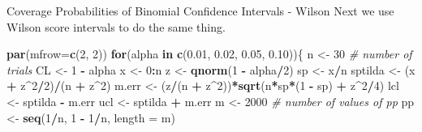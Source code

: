 \documentclass[
  ignorenonframetext,
]{beamer}
\newenvironment{Shaded}{\begin{snugshade}}{\end{snugshade}}
\newcommand{\AttributeTok}[1]{\textcolor[rgb]{0.13,0.29,0.53}{#1}}
\newcommand{\CommentTok}[1]{\textcolor[rgb]{0.56,0.35,0.01}{\textit{#1}}}
\newcommand{\ControlFlowTok}[1]{\textcolor[rgb]{0.13,0.29,0.53}{\textbf{#1}}}
\newcommand{\DecValTok}[1]{\textcolor[rgb]{0.00,0.00,0.81}{#1}}
\newcommand{\FloatTok}[1]{\textcolor[rgb]{0.00,0.00,0.81}{#1}}
\newcommand{\FunctionTok}[1]{\textcolor[rgb]{0.13,0.29,0.53}{\textbf{#1}}}
\newcommand{\NormalTok}[1]{#1}
\newcommand{\OtherTok}[1]{\textcolor[rgb]{0.56,0.35,0.01}{#1}}
\newcommand{\SpecialCharTok}[1]{\textcolor[rgb]{0.81,0.36,0.00}{\textbf{#1}}}
\begin{document}
\begin{frame}[fragile]{Coverage Probabilities of Binomial Confidence
Intervals - Wilson}
\protect\hypertarget{coverage-probabilities-of-binomial-confidence-intervals---wilson}{}
Next we use Wilson score intervals to do the same thing.

\tiny

\begin{Shaded}
\begin{Highlighting}[]
\FunctionTok{par}\NormalTok{(}\AttributeTok{mfrow=}\FunctionTok{c}\NormalTok{(}\DecValTok{2}\NormalTok{, }\DecValTok{2}\NormalTok{))}
\ControlFlowTok{for}\NormalTok{(alpha }\ControlFlowTok{in} \FunctionTok{c}\NormalTok{(}\FloatTok{0.01}\NormalTok{, }\FloatTok{0.02}\NormalTok{, }\FloatTok{0.05}\NormalTok{, }\FloatTok{0.10}\NormalTok{))\{}
\NormalTok{n }\OtherTok{\textless{}{-}} \DecValTok{30}     \CommentTok{\# number of trials}
\NormalTok{CL }\OtherTok{\textless{}{-}} \DecValTok{1} \SpecialCharTok{{-}}\NormalTok{ alpha}
\NormalTok{x }\OtherTok{\textless{}{-}} \DecValTok{0}\SpecialCharTok{:}\NormalTok{n }
\NormalTok{z }\OtherTok{\textless{}{-}} \FunctionTok{qnorm}\NormalTok{(}\DecValTok{1} \SpecialCharTok{{-}}\NormalTok{ alpha}\SpecialCharTok{/}\DecValTok{2}\NormalTok{)}
\NormalTok{sp }\OtherTok{\textless{}{-}}\NormalTok{ x}\SpecialCharTok{/}\NormalTok{n}
\NormalTok{sptilda }\OtherTok{\textless{}{-}}\NormalTok{ (x }\SpecialCharTok{+}\NormalTok{ z}\SpecialCharTok{\^{}}\DecValTok{2}\SpecialCharTok{/}\DecValTok{2}\NormalTok{)}\SpecialCharTok{/}\NormalTok{(n }\SpecialCharTok{+}\NormalTok{ z}\SpecialCharTok{\^{}}\DecValTok{2}\NormalTok{)}
\NormalTok{m.err }\OtherTok{\textless{}{-}}\NormalTok{ (z}\SpecialCharTok{/}\NormalTok{(n }\SpecialCharTok{+}\NormalTok{ z}\SpecialCharTok{\^{}}\DecValTok{2}\NormalTok{))}\SpecialCharTok{*}\FunctionTok{sqrt}\NormalTok{(n}\SpecialCharTok{*}\NormalTok{sp}\SpecialCharTok{*}\NormalTok{(}\DecValTok{1} \SpecialCharTok{{-}}\NormalTok{ sp) }\SpecialCharTok{+}\NormalTok{ z}\SpecialCharTok{\^{}}\DecValTok{2}\SpecialCharTok{/}\DecValTok{4}\NormalTok{)}
\NormalTok{lcl }\OtherTok{\textless{}{-}}\NormalTok{ sptilda }\SpecialCharTok{{-}}\NormalTok{ m.err}
\NormalTok{ucl }\OtherTok{\textless{}{-}}\NormalTok{ sptilda }\SpecialCharTok{+}\NormalTok{ m.err}
\NormalTok{m }\OtherTok{\textless{}{-}} \DecValTok{2000} \CommentTok{\# number of values of pp}
\NormalTok{pp }\OtherTok{\textless{}{-}} \FunctionTok{seq}\NormalTok{(}\DecValTok{1}\SpecialCharTok{/}\NormalTok{n, }\DecValTok{1} \SpecialCharTok{{-}} \DecValTok{1}\SpecialCharTok{/}\NormalTok{n, }\AttributeTok{length =}\NormalTok{ m)}

\end{Highlighting}
\end{Shaded}
\end{frame}
\end{document}
